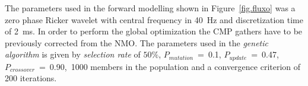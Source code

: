 \documentclass{vie16}
\begin{document}
\begin{table}
\caption{Model parameters.}
\end{table}

The parameters used in the forward modelling shown in 
Figure~\ref{fig.fluxo} was a zero phase Ricker wavelet with central frequency 
in 40~Hz and discretization time of 2~ms. In order to perform the global 
optimization the CMP gathers have to be previously corrected from the NMO.
The parameters used in the \textit{genetic algorithm} is given by 
\textit{selection rate} of $50\%$, $P_{mutation}$~=~0.1, 
$P_{update}$~=~0.47, $P_{crossover}$~=~0.90,~1000 members in the 
population and a convergence criterion of 200 iterations.
\end{document}
